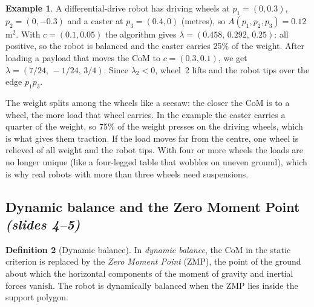 \documentclass[11pt,a4paper]{article}
\theoremstyle{definition}
\newtheorem{definition}{Definition}[section]
\newtheorem{example}[definition]{Example}
\theoremstyle{plain}
\newtheorem{corollary}[definition]{Corollary}
\theoremstyle{remark}
\begin{document}
\begin{example}
A differential-drive robot has driving wheels at $p_1=(0,0.3)$, $p_2=(0,-0.3)$ and a caster at $p_3=(0.4,0)$ (metres), so $A(p_1,p_2,p_3)=0.12$\,m$^2$. With $c=(0.1,0.05)$ the algorithm gives $\lambda=(0.458,\,0.292,\,0.25)$: all positive, so the robot is balanced and the caster carries 25\% of the weight. After loading a payload that moves the CoM to $c=(0.3,0.1)$, we get $\lambda=(7/24,\,-1/24,\,3/4)$. Since $\lambda_2<0$, wheel~2 lifts and the robot tips over the edge $p_1p_3$.
\end{example}


\begin{intuition}
The weight splits among the wheels like a seesaw: the closer the CoM is to a wheel, the more load that wheel carries. In the example the caster carries a quarter of the weight, so 75\% of the weight presses on the driving wheels, which is what gives them traction. If the load moves far from the centre, one wheel is relieved of all weight and the robot tips. With four or more wheels the loads are no longer unique (like a four-legged table that wobbles on uneven ground), which is why real robots with more than three wheels need suspensions.
\end{intuition}

\subsection{Dynamic balance and the Zero Moment Point \emph{(slides 4--5)}}

\begin{definition}[Dynamic balance]
In \emph{dynamic balance}, the CoM in the static criterion is replaced by the \emph{Zero Moment Point} (ZMP), the point of the ground about which the horizontal components of the moment of gravity and inertial forces vanish. The robot is dynamically balanced when the ZMP lies inside the support polygon.
\end{definition}
\end{document}
